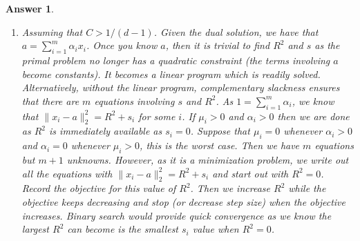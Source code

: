 \documentclass[12pt]{article}
\theoremstyle{colon}
\newtheorem*{answer}{Answer}
\begin{document}
\begin{answer}
\begin{enumerate}[label=\alph*)]
    \item Assuming that $C > 1/(d-1)$. Given the dual solution, we have that $a = \sum_{i=1}^m \alpha_i x_i$. Once you know $a$, then it is trivial to find $R^2$ and $s$ as the primal problem no longer has a quadratic constraint (the terms involving $a$ become constants). It becomes a linear program which is readily solved. Alternatively, without the linear program, complementary slackness ensures that there are $m$ equations involving $s$ and $R^2$. As $1 = \sum_{i=1}^m \alpha_i$, we know that $\lVert x_i - a \rVert_2^2 = R^2 + s_i$ for some $i$. If $\mu_i > 0$ and $\alpha_i > 0$ then we are done as $R^2$ is immediately available as $s_i = 0$. Suppose that $\mu_i = 0$ whenever $\alpha_i > 0$ and $\alpha_i = 0$ whenever $\mu_i > 0$, this is the worst case. Then we have $m$ equations but $m+1$ unknowns. However, as it is a minimization problem, we write out all the equations with $\lVert x_i - a \rVert_2^2 = R^2 + s_i$ and start out with $R^2 = 0$. Record the objective for this value of $R^2$. Then we increase $R^2$ while the objective keeps decreasing and stop (or decrease step size) when the objective increases. Binary search would provide quick convergence as we know the largest $R^2$ can become is the smallest $s_i$ value when $R^2 = 0$.
  \end{enumerate}
\end{answer}
\end{document}
